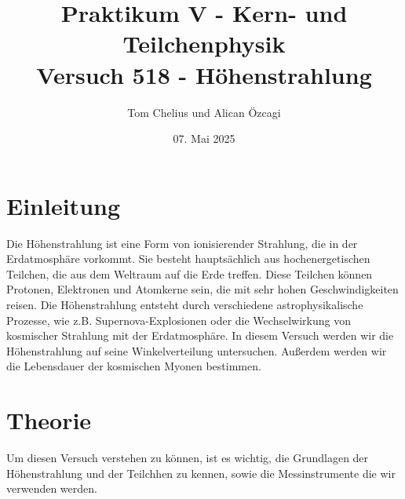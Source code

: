 \documentclass{article}
\title{Praktikum V - Kern- und Teilchenphysik\\Versuch 518 - Höhenstrahlung}
\author{Tom Chelius und Alican Özcagi}
\date{07. Mai 2025}
\begin{document}
\maketitle
\newpage
\tableofcontents

\newpage

\section{Einleitung}
Die Höhenstrahlung ist eine Form von ionisierender Strahlung, die in der Erdatmosphäre vorkommt. 
Sie besteht hauptsächlich aus hochenergetischen Teilchen, die aus dem Weltraum auf die Erde treffen. 
Diese Teilchen können Protonen, Elektronen und Atomkerne sein, die mit sehr hohen Geschwindigkeiten reisen. 
Die Höhenstrahlung entsteht durch verschiedene astrophysikalische Prozesse, wie z.B. Supernova-Explosionen oder 
die Wechselwirkung von kosmischer Strahlung mit der Erdatmosphäre.
In diesem Versuch werden wir die Höhenstrahlung auf seine Winkelverteilung untersuchen.
Außerdem werden wir die Lebensdauer der kosmischen Myonen bestimmen.

\section{Theorie}
Um diesen Versuch verstehen zu können, ist es wichtig, die Grundlagen der Höhenstrahlung und der Teilchhen zu kennen, sowie die 
Messinstrumente die wir verwenden werden. 
\end{document}
